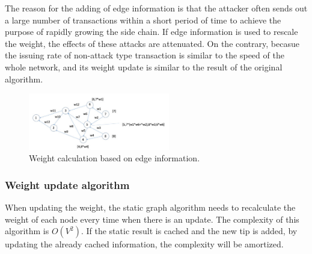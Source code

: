 The reason for the adding of edge information is that the attacker often sends out a large number of transactions 
within a short period of time to achieve the purpose of rapidly growing the side chain. 
If edge information is used to rescale the weight, the effects of these attacks are attenuated. 
On the contrary, becasue the issuing rate of non-attack type transaction is similar to the speed of the whole network,
and its weight update is similar to the result of the original algorithm.

\begin{figure}[!ht]
\begin{center}
\includegraphics[width=0.55\textwidth]{figures/edge_info.png}
    \caption{
        Weight calculation based on edge information.
     }
\label{edge_info}
\end{center}
\end{figure}

\subsubsection{Weight update algorithm}
When updating the weight, the static graph algorithm needs to recalculate the weight of each node every time when there is an update. 
The complexity of this algorithm is $O(V^2)$. 
If the static result is cached and the new tip is added, by updating the already cached information, the complexity will be amortized. 

